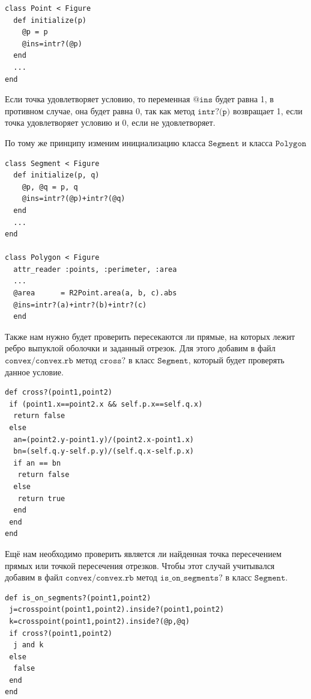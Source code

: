 \begin{small}
\begin{verbatim}
class Point < Figure
  def initialize(p) 
    @p = p
    @ins=intr?(@p) 
  end
  ...
end
\end{verbatim}
\end{small}

Если точка удовлетворяет условию, то переменная $\texttt{@ins}$ будет равна 1, в противном случае, она будет равна 0, так как метод $\texttt{intr?(p)}$ возвращает 1, если точка удовлетворяет условию и 0, если не удовлетворяет.

По тому же принципу изменим инициализацию класса $\texttt{Segment}$ и класса $\texttt{Polygon}$

\begin{small}
\begin{verbatim}
class Segment < Figure
  def initialize(p, q) 
    @p, @q = p, q
    @ins=intr?(@p)+intr?(@q)
  end
  ...
end

class Polygon < Figure
  attr_reader :points, :perimeter, :area 
  ...
  @area      = R2Point.area(a, b, c).abs
  @ins=intr?(a)+intr?(b)+intr?(c)
  end
\end{verbatim}
\end{small}




Также нам нужно будет проверить пересекаются ли прямые, на которых лежит ребро выпуклой оболочки и 
заданный отрезок. Для этого добавим в файл $\texttt{convex/convex.rb}$ метод $\texttt{cross?}$ в класс 
$\texttt{Segment}$, который будет проверять данное условие.

\begin{small}
\begin{verbatim}
def cross?(point1,point2)
 if (point1.x==point2.x && self.p.x==self.q.x)
  return false
 else
  an=(point2.y-point1.y)/(point2.x-point1.x)
  bn=(self.q.y-self.p.y)/(self.q.x-self.p.x)
  if an == bn
   return false
  else
   return true
  end
 end
end
\end{verbatim}
\end{small}

Ещё нам необходимо проверить является ли найденная точка пересечением прямых или точкой пересечения отрезков. 
Чтобы этот случай учитывался добавим в файл $\texttt{convex/convex.rb}$ метод $\texttt{is\_on\_segments?}$ в 
класс $\texttt{Segment}$.


\begin{small}
\begin{verbatim}
def is_on_segments?(point1,point2)
 j=crosspoint(point1,point2).inside?(point1,point2)
 k=crosspoint(point1,point2).inside?(@p,@q)
 if cross?(point1,point2)
  j and k
 else
  false
 end
end
\end{verbatim}
\end{small}

